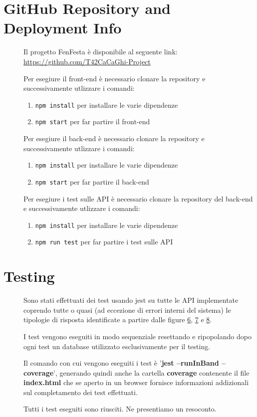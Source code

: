 \documentclass{article}
\begin{document}
\section{GitHub Repository and Deployment Info}
\begin{description}
    \item[] Il progetto FenFesta è disponibile al seguente link: \url{https://github.com/T42CaCaGhi-Project}
    \item[] Per esegiure il front-end è necessario clonare la repository e successivamente utlizzare i comandi:
        \begin{enumerate}
            \item \texttt{npm install} per installare le varie dipendenze
            \item \texttt{npm start} per far partire il front-end
        \end{enumerate}
    \item[] Per esegiure il back-end è necessario clonare la repository e successivamente utlizzare i comandi:
        \begin{enumerate}
            \item \texttt{npm install} per installare le varie dipendenze
            \item \texttt{npm start} per far partire il back-end
        \end{enumerate}
    \item[] Per esegiure i test sulle API è necessario clonare la repository del back-end e successivamente utlizzare i comandi:
        \begin{enumerate}
            \item \texttt{npm install} per installare le varie dipendenze
            \item \texttt{npm run test} per far partire i test sulle API
        \end{enumerate}
\end{description}
\clearpage
\section{Testing}
\begin{description}
    \item[] Sono stati effettuati dei test usando jest su tutte le API implementate coprendo tutte o quasi (ad eccezione di errori interni del sistema) le tipologie di risposta identificate a partire dalle figure \hyperref[img:6]{6}, \hyperref[img:7]{7} e \hyperref[img:8]{8}.
    \item[] I test vengono eseguiti in modo sequenziale resettando e ripopolando dopo ogni test un database utilizzato esclusivamente per il testing.
    \item[] Il comando con cui vengono eseguiti i test è '\textbf{jest --runInBand --coverage}', generando quindi anche la cartella \textbf{coverage} contenente il file \textbf{index.html} che se aperto in un browser fornisce informazioni addizionali sul completamento dei test effettuati.
    \item[] Tutti i test eseguiti sono riusciti. Ne presentiamo un resoconto.
\end{description}
\end{document}
